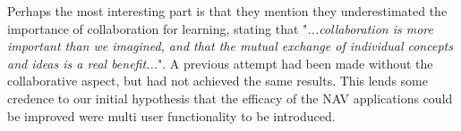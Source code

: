 Perhaps the most interesting part is that they mention they underestimated the importance of collaboration for learning, stating that "\textit{...collaboration is more important than we imagined, and that the mutual exchange of individual concepts and ideas is a real benefit...}". A previous attempt had been made without the collaborative aspect, but had not achieved the same results. This lends some credence to our initial hypothesis that the efficacy of the NAV applications could be improved were multi user functionality to be introduced. 





